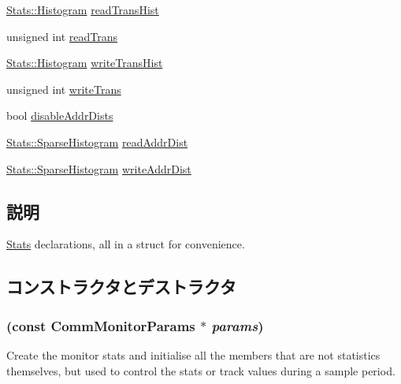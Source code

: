 \begin{DoxyCompactItemize}
\item 
\hyperlink{classStats_1_1Histogram}{Stats::Histogram} \hyperlink{structCommMonitor_1_1MonitorStats_a40c4a13f526893ea4f8d068378ce22a0}{readTransHist}
\item 
unsigned int \hyperlink{structCommMonitor_1_1MonitorStats_a1f0c5ba2e762ffa5a72d2377150ec73c}{readTrans}
\item 
\hyperlink{classStats_1_1Histogram}{Stats::Histogram} \hyperlink{structCommMonitor_1_1MonitorStats_ae8f93c14ae2f3a7576899eb0630db62a}{writeTransHist}
\item 
unsigned int \hyperlink{structCommMonitor_1_1MonitorStats_a5e5fcf61cd0db2a5a808623fadd8e23e}{writeTrans}
\item 
bool \hyperlink{structCommMonitor_1_1MonitorStats_aa3ef9cc6390ad90e102f7027758b0d65}{disableAddrDists}
\item 
\hyperlink{classStats_1_1SparseHistogram}{Stats::SparseHistogram} \hyperlink{structCommMonitor_1_1MonitorStats_a4031ec599a20d5a1890ba1d37a565fbf}{readAddrDist}
\item 
\hyperlink{classStats_1_1SparseHistogram}{Stats::SparseHistogram} \hyperlink{structCommMonitor_1_1MonitorStats_a2eaaddbc017182789d892a94a8aad545}{writeAddrDist}
\end{DoxyCompactItemize}


\subsection{説明}
\hyperlink{namespaceStats}{Stats} declarations, all in a struct for convenience. 

\subsection{コンストラクタとデストラクタ}
\hypertarget{structCommMonitor_1_1MonitorStats_a6e93f7a5c6eb0e765d7a1a51fca229d8}{
\subsubsection[{MonitorStats}]{ (const CommMonitorParams $\ast$ {\em params})}}
\label{structCommMonitor_1_1MonitorStats_a6e93f7a5c6eb0e765d7a1a51fca229d8}
Create the monitor stats and initialise all the members that are not statistics themselves, but used to control the stats or track values during a sample period. 


